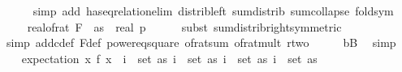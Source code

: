 \begin{isabellebody}
\ \ \ \ \isamarkupfalse%
\ {\isacharparenleft}{\kern0pt}simp\ add{\isacharcolon}{\kern0pt}\ has{\isacharunderscore}{\kern0pt}eq{\isacharunderscore}{\kern0pt}relation{\isacharunderscore}{\kern0pt}elim\ distrib{\isacharunderscore}{\kern0pt}left\ sum{\isachardot}{\kern0pt}distrib\ sum{\isacharunderscore}{\kern0pt}collapse\ fold{\isacharunderscore}{\kern0pt}sym{\isacharparenright}{\kern0pt}\isanewline
\ \ \isamarkupfalse%
\ \isamarkupfalse%
\ {\isachardoublequoteopen}{\isachardot}{\kern0pt}{\isachardot}{\kern0pt}{\isachardot}{\kern0pt}\ {\isacharequal}{\kern0pt}\ real{\isacharunderscore}{\kern0pt}of{\isacharunderscore}{\kern0pt}rat\ {\isacharparenleft}{\kern0pt}F\ {}\ as{\isacharparenright}{\kern0pt}\ {\isacharasterisk}{\kern0pt}\ {\isacharparenleft}{\kern0pt}{\isacharparenleft}{\kern0pt}real\ p{\isacharparenright}{\kern0pt}{\isacharcircum}{\kern0pt}{}{\isacharminus}{\kern0pt}{}{\isacharparenright}{\kern0pt}{\isachardoublequoteclose}\isanewline
\ \ \ \ \isamarkupfalse%
\ {\isacharparenleft}{\kern0pt}subst\ sum{\isacharunderscore}{\kern0pt}distrib{\isacharunderscore}{\kern0pt}right{\isacharbrackleft}{\kern0pt}symmetric{\isacharbrackright}{\kern0pt}{\isacharparenright}{\kern0pt}\isanewline
\ \ \ \ \isamarkupfalse%
\ {\isacharparenleft}{\kern0pt}simp\ add{\isacharcolon}{\kern0pt}c{\isacharunderscore}{\kern0pt}def\ F{\isacharunderscore}{\kern0pt}def\ power{}{\isacharunderscore}{\kern0pt}eq{\isacharunderscore}{\kern0pt}square\ of{\isacharunderscore}{\kern0pt}rat{\isacharunderscore}{\kern0pt}sum\ of{\isacharunderscore}{\kern0pt}rat{\isacharunderscore}{\kern0pt}mult\ r{\isacharunderscore}{\kern0pt}two{\isacharparenright}{\kern0pt}\isanewline
\ \ \isamarkupfalse%
\ \isamarkupfalse%
\ b{\isacharcolon}{\kern0pt}{\isacharquery}{\kern0pt}B\ \isamarkupfalse%
\ simp\isanewline
\isanewline
\ \ \isamarkupfalse%
\ {\isachardoublequoteopen}expectation\ {\isacharparenleft}{\kern0pt}{\isasymlambda}x{\isachardot}{\kern0pt}\ {\isacharparenleft}{\kern0pt}f\ x{\isacharparenright}{\kern0pt}\ {\isacharequal}{\kern0pt}\ {\isacharparenleft}{\kern0pt}{\isasymSum}i{}\ {\isasymin}\ set\ as{\isachardot}{\kern0pt}\ {\isacharparenleft}{\kern0pt}{\isasymSum}i{}\ {\isasymin}\ set\ as{\isachardot}{\kern0pt}\ {\isacharparenleft}{\kern0pt}{\isasymSum}i{}\ {\isasymin}\ set\ as{\isachardot}{\kern0pt}\ {\isacharparenleft}{\kern0pt}{\isasymSum}i{}\ {\isasymin}\ set\ as{\isachardot}{\kern0pt}\isanewline

\end{isabellebody}
